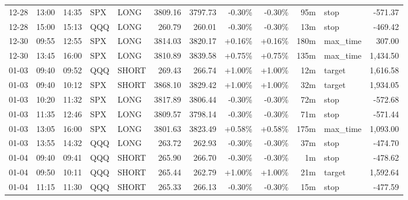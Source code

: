 \documentclass[11pt,a4paper,twoside]{article}
\begin{document}
\begin{center}
\begin{longtable}{>{\color{txtmain}}l l l l l r r r r r >{\color{txtmain}}l r}
12-28 & 13:00 & 14:35 & SPX & LONG & 3809.16 & 3797.73 & \textcolor{lossred}{-0.30\%} & \textcolor{lossred}{-0.30\%} & 95m & stop & \textcolor{lossred}{-571.37} \\
12-28 & 15:00 & 15:13 & QQQ & LONG & 260.79 & 260.01 & \textcolor{lossred}{-0.30\%} & \textcolor{lossred}{-0.30\%} & 13m & stop & \textcolor{lossred}{-469.42} \\
12-30 & 09:55 & 12:55 & SPX & LONG & 3814.03 & 3820.17 & \textcolor{wingreen}{+0.16\%} & \textcolor{wingreen}{+0.16\%} & 180m & max\_time & \textcolor{wingreen}{307.00} \\
12-30 & 13:45 & 16:00 & SPX & LONG & 3810.89 & 3839.58 & \textcolor{wingreen}{+0.75\%} & \textcolor{wingreen}{+0.75\%} & 135m & max\_time & \textcolor{wingreen}{1,434.50} \\
01-03 & 09:40 & 09:52 & QQQ & SHORT & 269.43 & 266.74 & \textcolor{wingreen}{+1.00\%} & \textcolor{wingreen}{+1.00\%} & 12m & target & \textcolor{wingreen}{1,616.58} \\
01-03 & 09:40 & 10:12 & SPX & SHORT & 3868.10 & 3829.42 & \textcolor{wingreen}{+1.00\%} & \textcolor{wingreen}{+1.00\%} & 32m & target & \textcolor{wingreen}{1,934.05} \\
01-03 & 10:20 & 11:32 & SPX & LONG & 3817.89 & 3806.44 & \textcolor{lossred}{-0.30\%} & \textcolor{lossred}{-0.30\%} & 72m & stop & \textcolor{lossred}{-572.68} \\
01-03 & 11:35 & 12:46 & SPX & LONG & 3809.57 & 3798.14 & \textcolor{lossred}{-0.30\%} & \textcolor{lossred}{-0.30\%} & 71m & stop & \textcolor{lossred}{-571.44} \\
01-03 & 13:05 & 16:00 & SPX & LONG & 3801.63 & 3823.49 & \textcolor{wingreen}{+0.58\%} & \textcolor{wingreen}{+0.58\%} & 175m & max\_time & \textcolor{wingreen}{1,093.00} \\
01-03 & 13:55 & 14:32 & QQQ & LONG & 263.72 & 262.93 & \textcolor{lossred}{-0.30\%} & \textcolor{lossred}{-0.30\%} & 37m & stop & \textcolor{lossred}{-474.70} \\
01-04 & 09:40 & 09:41 & QQQ & SHORT & 265.90 & 266.70 & \textcolor{lossred}{-0.30\%} & \textcolor{lossred}{-0.30\%} & 1m & stop & \textcolor{lossred}{-478.62} \\
01-04 & 09:50 & 10:11 & QQQ & SHORT & 265.44 & 262.79 & \textcolor{wingreen}{+1.00\%} & \textcolor{wingreen}{+1.00\%} & 21m & target & \textcolor{wingreen}{1,592.64} \\
01-04 & 11:15 & 11:30 & QQQ & SHORT & 265.33 & 266.13 & \textcolor{lossred}{-0.30\%} & \textcolor{lossred}{-0.30\%} & 15m & stop & \textcolor{lossred}{-477.59} \\

\end{longtable}
\end{center}
\end{document}
